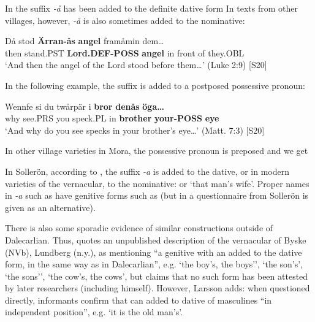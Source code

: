 In  the suffix\textit{ {}-å} has been added to the definite dative form In texts from other villages, however,\textit{ {}-å} is also sometimes added to the nominative:

\ea\label{}
\gll Då  stod  \textbf{Ärran-ås} \textbf{angel} framåmin  dem…\\
then  stand.PST  \textbf{Lord.DEF-POSS} \textbf{angel} in front of  they.OBL\\
\glt ‘And then the angel of the Lord stood before them…’ (Luke 2:9) [S20]
\z

In the following example, the suffix is added to a postposed possessive pronoun:

\ea\label{}
\gll Wennfe  si  du  twårpär  i  \textbf{bror} \textbf{denås} \textbf{öga…}\\
why  see.PRS  you  speck.PL  in  \textbf{brother} \textbf{your-POSS} \textbf{eye}\\
\glt ‘And why do you see specks in your brother’s eye…’ (Matt. 7:3) [S20]
\z

In other village varieties in Mora, the possessive pronoun is preposed and we get 

In Sollerön, according to \citet[357]{AnderssonEtAl1999}, the suffix\textit{ {}-a} is added to the dative, or in modern varieties of the vernacular, to the nominative:  or  ‘that man’s wife’. Proper names in\textit{ {}-a} such as  have genitive forms such as (but in a questionnaire from Sollerön  is given as an alternative).

There is also some sporadic evidence of similar constructions outside of Dalecarlian. Thus, \citet[124]{Larsson1929} quotes an unpublished description of the vernacular of Byske (NVb), Lundberg (n.y.), as mentioning “a genitive with an  added to the dative form, in the same way as in Dalecarlian”, e.g.  ‘the boy’s, the boys’’,  ‘the son’s’,  ‘the sons’’,  ‘the cow’s, the cows’, but claims that no such form has been attested by later researchers (including himself). However, Larsson adds: when questioned directly, informants confirm that  can added to dative of masculines “in independent position”, e.g.  ‘it is the old man’s’. 

